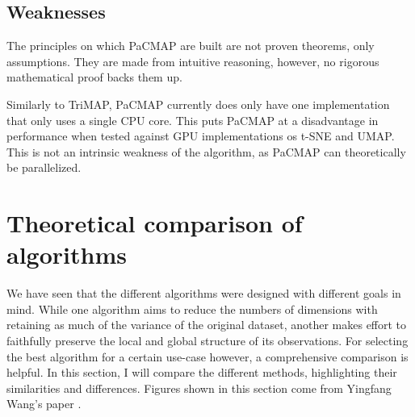 \subsection{Weaknesses}

The principles on which PaCMAP are built are not proven theorems, only assumptions. They are made from intuitive reasoning, however, no rigorous mathematical proof backs them up.

Similarly to TriMAP, PaCMAP currently does only have one implementation that only uses a single CPU core. This puts PaCMAP at a disadvantage in performance when tested against GPU implementations os t-SNE and UMAP. This is not an intrinsic weakness of the algorithm, as PaCMAP can theoretically be parallelized.

\section{Theoretical comparison of algorithms}

We have seen that the different algorithms were designed with different goals in mind. While one algorithm aims to reduce the numbers of dimensions with retaining as much of the variance of the original dataset, another makes effort to faithfully preserve the local and global structure of its observations. For selecting the best algorithm for a certain use-case however, a comprehensive comparison is helpful. In this section, I will compare the different methods, highlighting their similarities and differences. Figures shown in this section come from Yingfang Wang's paper \cite{bib:pacmap}.


